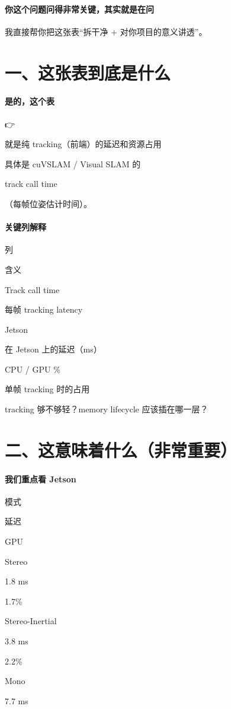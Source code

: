 \documentclass[12pt]{article}
\begin{document}
\paragraph{你这个问题问得非常关键，其实就是在问}
我直接帮你把这张表“拆干净 + 对你项目的意义讲透”。

\section{一、这张表到底是什么}
\paragraph{是的，这个表}
👉

就是纯 tracking（前端）的延迟和资源占用

具体是 cuVSLAM / Visual SLAM 的

track call time

（每帧位姿估计时间）。

\paragraph{关键列解释}
列

含义

Track call time

每帧 tracking latency

Jetson

在 Jetson 上的延迟（ms）

CPU / GPU \%

单帧 tracking 时的占用

tracking 够不够轻？memory lifecycle 应该插在哪一层？

\section{二、这意味着什么（非常重要）}
\paragraph{我们重点看 Jetson}
模式

延迟

GPU

Stereo

1.8 ms

1.7\%

Stereo-Inertial

3.8 ms

2.2\%

Mono

7.7 ms
\end{document}
